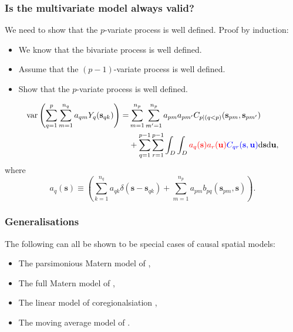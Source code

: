 \documentclass{beamer}
\newcommand{\intd} {\mathrm{d}}
\newcommand{\svec} {\textbf{s}}
\newcommand{\uvec} {\textbf{u}}
\newcommand{\var}{\mathrm{var}}
\newcommand{\red}{\textcolor{red}}%
\newcommand{\blue}{\textcolor{blue}}
\begin{document}
\begin{frame}
\frametitle{Is the multivariate model always valid?}

We need to show that the $p$-variate process is well defined. Proof by induction:
\begin{itemize}
  \item We know that the bivariate process is well defined.
  \item Assume that the $(p-1)$-variate process is well defined.
  \item Show that the $p$-variate process is well defined.
\end{itemize}

\vspace{-0.3in}
\begin{align*}
\var\left(\sum_{q=1}^p \sum_{m=1}^{n_q} a_{qm}Y_q(\svec_{qk})\right)=& \sum_{m=1}^{n_p}\sum_{m'=1}^{n_p}a_{pm}a_{pm'}C_{p \mid  (q < p)}(\svec_{pm},\svec_{pm'}) \\
&+ \sum_{q=1}^{p-1}\sum_{r=1}^{p-1}\int_D\int_D\red{a_q(\svec)a_r(\uvec)}\blue{C_{qr}(\svec,\uvec)}\intd \svec \intd \uvec, 
\end{align*}
where
\begin{equation*}
a_q(\svec) \equiv \left(\sum_{k=1}^{n_q}a_{qk}\delta(\svec - \svec_{qk}) + \sum_{m=1}^{n_p}a_{pm}b_{pq}(\svec_{pm},\svec)\right).
\end{equation*}
\end{frame}


\begin{frame}
\frametitle{Generalisations}

The following can all be shown to be special cases of causal spatial models:

\begin{itemize}
\item The parsimonious Matern model of \cite{Gneitingetal2010},
\item The full Matern model of \cite{Gneitingetal2010},
\item The linear model of coregionalsiation \cite{Wackernagel1995},
\item The moving average model of \cite{verHoef_1998}.
\end{itemize}
\end{frame}

\end{document}
